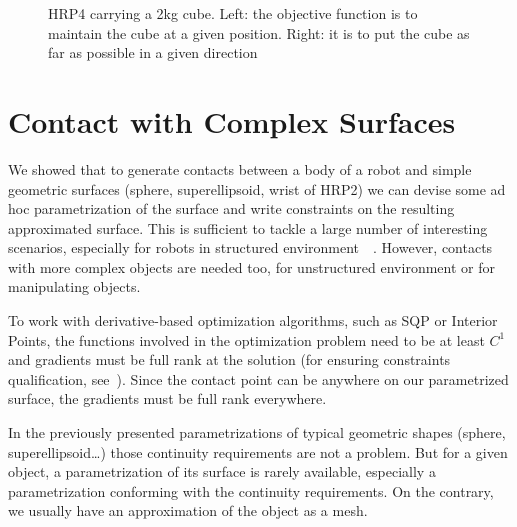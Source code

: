 \begin{figure}
\centering
  \centering
  \setlength\fboxsep{0pt}
  \setlength\fboxrule{1pt}
\caption{HRP4 carrying a 2kg cube.
Left: the objective function is to maintain the cube at a given position.
Right: it is to put the cube as far as possible in a given direction}
\label{fig:hrp4_cube}
\end{figure}

\section{Contact with Complex Surfaces}
\label{sec:contact_with_complex_surfaces}

We showed that to generate contacts between a body of a robot and simple geometric surfaces (sphere, superellipsoid, wrist of HRP2) we can devise some ad hoc parametrization of the surface and write constraints on the resulting approximated surface.
This is sufficient to tackle a large number of interesting scenarios, especially for robots in structured environment~\cite{vaillant:humanoids:2014}~\cite{vaillant:autonomousrobots:2016}.
However, contacts with more complex objects are needed too, for unstructured environment or for manipulating objects.

To work with derivative-based optimization algorithms, such as SQP or Interior Points, the functions involved in the optimization problem need to be at least $C^1$ and gradients must be full rank at the solution (for ensuring constraints qualification, see~\cite{nocedal:book:2006}).
Since the contact point can be anywhere on our parametrized surface, the gradients must be full rank everywhere.

In the previously presented parametrizations of typical geometric shapes (sphere, superellipsoid\ldots) those continuity requirements are not a problem.
But for a given object, a parametrization of its surface is rarely available, especially a parametrization conforming with the continuity requirements.
On the contrary, we usually have an approximation of the object as a mesh.

